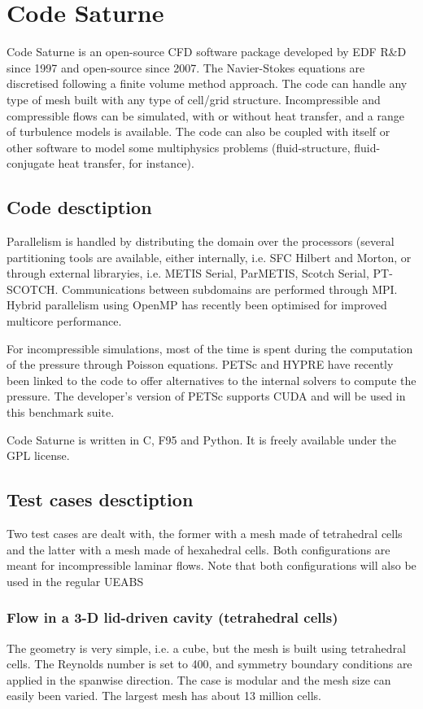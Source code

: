 \section{Code Saturne}
Code Saturne is an open-source CFD software package developed by EDF R\&D since 1997 and open-source since 2007. The Navier-Stokes equations are discretised following a finite volume method approach. The code can handle any type of mesh built with any type of cell/grid structure. Incompressible and compressible flows can be simulated, with or without heat transfer, and a range of turbulence models is available. The code can also be coupled with itself or other software to model some multiphysics problems (fluid-structure, fluid-conjugate heat transfer, for instance).

\subsection{Code desctiption}
Parallelism is handled by distributing the domain over the processors (several partitioning tools are available, either internally, i.e. SFC Hilbert and Morton, or through external libraryies, i.e. METIS Serial, ParMETIS, Scotch Serial, PT-SCOTCH. Communications between subdomains are performed through MPI. Hybrid parallelism using OpenMP has recently been optimised for improved multicore performance.

For incompressible simulations, most of the time is spent during the computation of the pressure through Poisson equations. PETSc and HYPRE have recently been linked to the code to offer alternatives to the internal solvers to compute the pressure. The developer’s version of PETSc supports CUDA and will be used in this benchmark suite.

Code Saturne is written in C, F95 and Python. It is freely available under the GPL license.

\subsection{Test cases desctiption}
Two test cases are dealt with, the former with a mesh made of tetrahedral cells and the latter with a mesh made of hexahedral cells. Both configurations are meant for incompressible laminar flows. Note that both configurations will also be used in the regular UEABS

\subsubsection{Flow in a 3-D lid-driven cavity (tetrahedral cells)}
The geometry is very simple, i.e. a cube, but the mesh is built using tetrahedral cells. The Reynolds number is set to 400, and symmetry boundary conditions are applied in the spanwise direction. The case is modular and the mesh size can easily been varied. The largest mesh has about 13 million cells.

